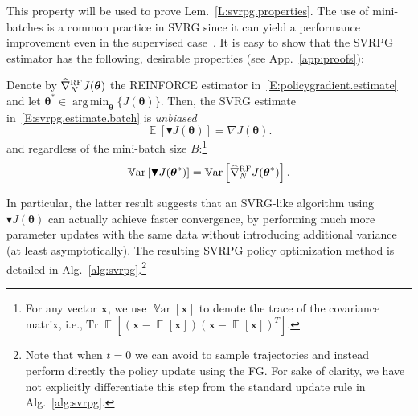 \documentclass{article}
\makeatletter
\theoremstyle{remark}
\theoremstyle{definition}
\DeclareRobustCommand{\ie}{i.e.,\@\xspace}
\DeclareMathOperator*{\argmin}{arg\,min}
\DeclareMathOperator*{\EV}{\mathbb{E}}
\DeclareMathOperator{\Tr}{Tr}
\DeclareMathOperator*{\Var}{\mathbb{V}ar}
\newcommand{\EVV}[2][\ppvect \in \ppspace]{\EV_{#1}\left[{#2}\right]}
\newcommand{\vtheta}{\boldsymbol{\theta}}
\newcommand{\Reward}{\mathcal{R}}
\newcommand{\gradJ}[1]{\nabla J(#1)}
\newcommand{\gradApp}[2]{\widehat{\nabla}_{#2}J(#1)}
\newcommand{\gradBlack}[1]{\blacktriangledown J(#1)}
\newcommand{\wh}[1]{\widehat{#1}}
\makeatother
\begin{document}
This property will be used to prove Lem.~\ref{L:svrpg.properties}.
The use of mini-batches is a common practice in SVRG since it can yield a performance improvement even in the supervised case~\citep{harikandeh2015stopwasting,konevcny2016mini}. It is easy to show that the SVRPG estimator has the following, desirable properties (see App.~\ref{app:proofs}):
\begin{lemma}\label{L:svrpg.properties}
Denote by $\wh{\nabla}_N^{\textsc{RF}} J(\vtheta)$ the REINFORCE estimator in~\eqref{E:policygradient.estimate} and let $\vtheta^* \in \argmin_{\vtheta} \{J(\vtheta)\}$. Then, the SVRG estimate in~\eqref{E:svrpg.estimate.batch} is \emph{unbiased}
\[
\mathop{\mathbb{E}}
\left[\blacktriangledown J(\vtheta)\right] = \gradJ{\vtheta}.
\]
and regardless of the mini-batch size $B$:\footnote{
For any vector $\mathbf{x}$, we use $\Var[\mathbf{x}]$ to denote the trace of the covariance matrix, \ie $\Tr\EVV[]{(\mathbf{x}-\EVV[]{\mathbf{x}})(\mathbf{x}-\EVV[]{\mathbf{x}})^T}$.}
\[
	\Var\left[\gradBlack{\vtheta^*}\right] = 
    \Var\left[\wh{\nabla}_N^{\textsc{RF}}J(\vtheta^*)\right].
\]
\end{lemma}

In particular, the latter result suggests that an SVRG-like algorithm using $\gradBlack{\vtheta}$ can actually achieve faster convergence, by performing much more parameter updates with the same data without introducing additional variance (at least asymptotically).
The resulting SVRPG policy optimization method is detailed in Alg.~\ref{alg:svrpg}.\footnote{Note that when $t=0$ we can avoid to sample trajectories and instead perform directly the policy update using the FG. For sake of clarity, we have not explicitly differentiate this step from the standard update rule in Alg.~\ref{alg:svrpg}.} 
\end{document}
